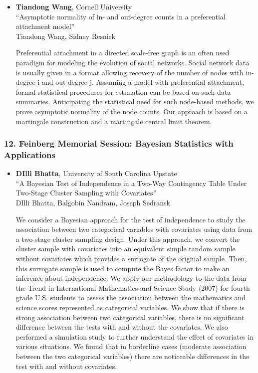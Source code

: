 \begin{itemize}
\item \textbf{Tiandong Wang}, Cornell University \\
``Asymptotic normality of in- and out-degree counts in a preferential attachment model'' \\
Tiandong Wang, Sidney Resnick


Preferential attachment in a directed scale-free graph is an often used paradigm for modeling the evolution of social networks. Social network data is usually given in a format allowing recovery of the number of nodes with in-degree i and out-degree j. Assuming a model with preferential attachment, formal statistical procedures for estimation can be based on such data summaries. Anticipating the statistical need for such node-based methods, we prove asymptotic normality of the node counts. Our approach is based on a martingale construction and a martingale central limit theorem.

\end{itemize}

\subsubsection*{12. Feinberg Memorial Session: Bayesian Statistics with Applications}

\begin{itemize}
\item \textbf{DIlli Bhatta}, University of South Carolina Upstate \\
``A Bayesian Test of Independence in a Two-Way  Contingency Table  Under Two-Stage Cluster Sampling with Covariates'' \\
DIlli Bhatta, Balgobin Nandram, Joseph Sedransk


We consider a Bayesian approach for the test of independence to study the association between two categorical variables with covariates using data from a two-stage cluster sampling design. Under this approach, we convert the cluster sample with covariates into an equivalent simple random sample without covariates which provides a surrogate of the original sample. Then, this surrogate sample is used to compute the Bayes factor to make an inference about independence.
We apply our methodology to the data from the Trend in International Mathematics and Science Study (2007) for fourth grade U.S. students to assess the association between the mathematics and science scores represented as categorical variables. 
We show that if there is strong association between two categorical variables, there is no significant difference between the tests with and without the covariates. We also performed a simulation study to further understand the effect of covariates in various situations. We found that in borderline cases (moderate association between the two categorical variables) there are noticeable differences in the test with and without covariates. 

\end{itemize}


